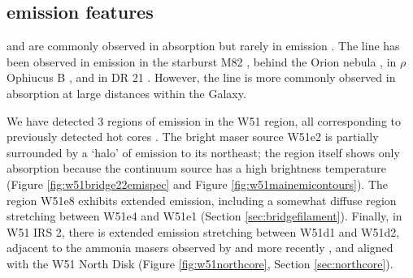 



\subsection{\formaldehyde emission features}



\formaldehyde \oneone and \twotwo are commonly observed in absorption
but rarely in emission \citep[e.g.][]{Mangum1993a,Araya2007b}.  The \twotwo
line has been observed in emission in the starburst M82 \citep{Mangum2008a},
behind the Orion nebula
\citep{Evans1975a,Kutner1976a,Batrla1983a,Johnston1983a,Bastien1985a,Wilson1989a},
in $\rho$ Ophiucus B
\citep{Loren1980a,Loren1983a,Martin-Pintado1983a,Wadiak1985a}, and in DR 21
\citep{Wilson1982a,Johnston1984a}.  However, the \twotwo line is more commonly
observed in absorption at large distances within the Galaxy.

We have detected 3 regions of \twotwo emission in the W51 region, all
corresponding to previously detected hot \ammonia cores
\citep{Zhang1997a,Goddi2015a}.  The bright
maser source W51e2 is partially surrounded by a `halo' of \formaldehyde \twotwo
emission to its northeast; the \hchii region itself shows only \twotwo
absorption because the continuum source has a high brightness temperature
(Figure \ref{fig:w51bridge22emispec} and Figure \ref{fig:w51mainemicontours}).
The \hchii region W51e8 exhibits extended \twotwo emission, including a
somewhat
diffuse region stretching between W51e4 and W51e1 (Section
\ref{sec:bridgefilament}).  Finally, in W51 IRS 2, there is extended \twotwo
emission stretching between W51d1 and W51d2, adjacent to the ammonia masers
observed by \citet{Zhang1995a} and more recently \citet{Goddi2015a}, and
aligned with the \citet{Zapata2010a} W51 North Disk (Figure
\ref{fig:w51northcore}, Section \ref{sec:northcore}).

